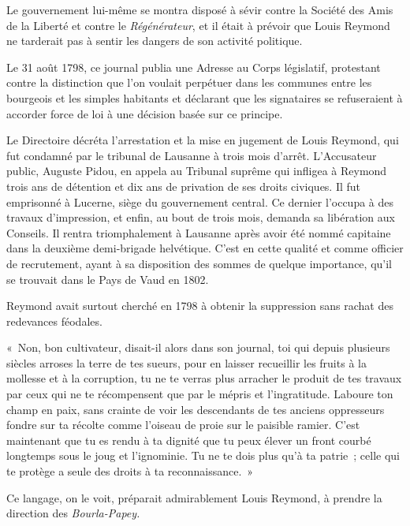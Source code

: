 \documentclass[french,twoside]{book} %
\newenvironment{quoteblock}%
  {\begin{quoting}}
  {\end{quoting}}
\newenvironment{quotebar}{%
    \def\FrameCommand{{\color{rubric!10!}\vrule width 0.5em} \hspace{0.9em}}%
    \def\OuterFrameSep{\itemsep} %
    \MakeFramed {\advance\hsize-\width \FrameRestore}
  }%
  {%
    \endMakeFramed
  }
\renewenvironment{quoteblock}%
  {%
    \savenotes
    \setstretch{0.9}
    \normalfont
    \begin{quotebar}
  }
  {%
    \end{quotebar}
    \spewnotes
  }
\begin{document}
\noindent Le gouvernement lui-même se montra disposé à sévir contre la Société des Amis de la Liberté et contre le \emph{Régénérateur}, et il était à prévoir que Louis Reymond ne tarderait pas à sentir les dangers de son activité politique.\par
Le 31 août 1798, ce journal publia une Adresse au Corps législatif, protestant contre la distinction que l’on voulait perpétuer dans les communes entre les bourgeois et les simples habitants et déclarant que les signataires se refuseraient à accorder force de loi à une décision basée sur ce principe.\par
Le Directoire décréta l’arrestation et la mise en jugement de Louis Reymond, qui fut condamné par le tribunal de Lausanne à trois mois d’arrêt. L’Accusateur public, Auguste Pidou, en appela au Tribunal suprême qui infligea à Reymond trois ans de détention et dix ans de privation de ses droits civiques. Il fut emprisonné à Lucerne, siège du gouvernement central. Ce dernier l’occupa à des travaux d’impression, et enfin, au bout de trois mois, demanda sa libération aux Conseils. Il rentra triomphalement à Lausanne après avoir été nommé capitaine dans la deuxième demi-brigade helvétique. C’est en cette qualité et comme officier de recrutement, ayant à sa disposition des sommes de quelque importance, qu’il se trouvait dans le Pays de Vaud en 1802.\par
Reymond avait surtout cherché en 1798 à obtenir la suppression sans rachat des redevances féodales.\par

\begin{quoteblock}
 \noindent « Non, bon cultivateur, disait-il alors dans son journal, toi qui depuis plusieurs siècles arroses la terre de tes sueurs, pour en laisser recueillir les fruits à la mollesse et à la corruption, tu ne te verras plus arracher le produit de tes travaux par ceux qui ne te récompensent que par le mépris et l’ingratitude. Laboure ton champ en paix, sans crainte de voir les descendants de tes anciens oppresseurs fondre sur ta récolte comme l’oiseau de proie sur le paisible ramier. C’est maintenant que tu es rendu à ta dignité que tu peux élever un front courbé longtemps sous le joug et l’ignominie. Tu ne te dois plus qu’à ta patrie ; celle qui te protège a seule des droits à ta reconnaissance. »
 \end{quoteblock}

\noindent Ce langage, on le voit, préparait admirablement Louis Reymond, à prendre la direction des \emph{Bourla-Papey.}
\end{document}

